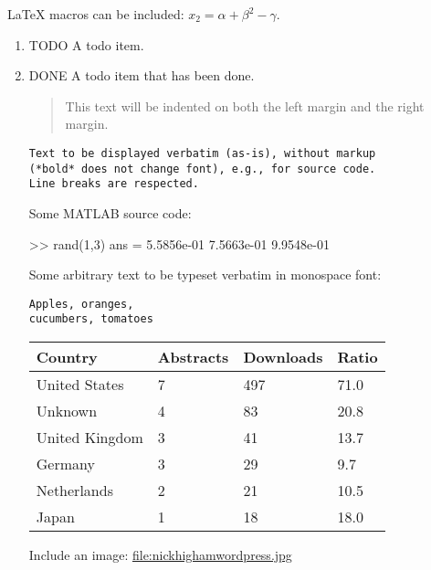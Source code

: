 \documentclass[]{article}
\newenvironment{Shaded}{}{}
\newcommand{\FloatTok}[1]{\textcolor[rgb]{0.25,0.63,0.44}{{#1}}}
\newcommand{\NormalTok}[1]{{#1}}
\begin{document}
LaTeX macros can be included: \(x_2 = \alpha + \beta^2 - \gamma\).

\begin{enumerate}
\item
  {TODO} A todo item.
\item
  {DONE} A todo item that has been done.

  \begin{quote}
  This text will be indented on both the left margin and the right
  margin.
  \end{quote}

\begin{verbatim}
Text to be displayed verbatim (as-is), without markup 
(*bold* does not change font), e.g., for source code. 
Line breaks are respected. 
\end{verbatim}

  Some MATLAB source code:

\begin{Shaded}
\begin{Highlighting}[]
\NormalTok{>> rand(}\FloatTok{1}\NormalTok{,}\FloatTok{3}\NormalTok{)}
\NormalTok{ans =}
   \FloatTok{5.5856e-01}   \FloatTok{7.5663e-01}   \FloatTok{9.9548e-01}
\end{Highlighting}
\end{Shaded}

  Some arbitrary text to be typeset verbatim in monospace font:

\begin{verbatim}
Apples, oranges,
cucumbers, tomatoes
\end{verbatim}

  \begin{longtable}[]{@{}llll@{}}
  \toprule
  Country & Abstracts & Downloads & Ratio\tabularnewline
  \midrule
  \endhead
  United States & 7 & 497 & 71.0\tabularnewline
  Unknown & 4 & 83 & 20.8\tabularnewline
  United Kingdom & 3 & 41 & 13.7\tabularnewline
  Germany & 3 & 29 & 9.7\tabularnewline
  Netherlands & 2 & 21 & 10.5\tabularnewline
  Japan & 1 & 18 & 18.0\tabularnewline
  \bottomrule
  \end{longtable}

  Include an image: \url{file:nickhighamwordpress.jpg}
\end{enumerate}
\end{document}
